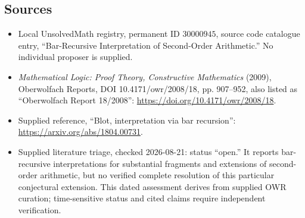 \documentclass[11pt]{article}
\begin{document}
\subsection{Sources}
\begin{itemize}
\item Local UnsolvedMath registry, permanent ID \(30000945\), source code catalogue entry, ``Bar-Recursive Interpretation of Second-Order Arithmetic.'' No individual proposer is supplied.
\item \emph{Mathematical Logic: Proof Theory, Constructive Mathematics} (2009), Oberwolfach Reports, DOI 10.4171/owr/2008/18, pp. 907--952, also listed as ``Oberwolfach Report 18/2008'': \url{https://doi.org/10.4171/owr/2008/18}.
\item Supplied reference, ``Blot, interpretation via bar recursion'': \url{https://arxiv.org/abs/1804.00731}.
\item Supplied literature triage, checked 2026-08-21: status ``open.'' It reports bar-recursive interpretations for substantial fragments and extensions of second-order arithmetic, but no verified complete resolution of this particular conjectural extension. This dated assessment derives from supplied OWR curation; time-sensitive status and cited claims require independent verification.
\end{itemize}
\end{document}
